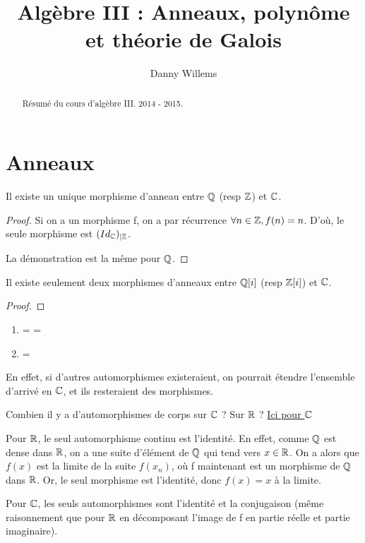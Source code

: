 \documentclass[a4paper, 12pt]{article}
\author{Danny Willems}
\title{Algèbre III : Anneaux, polynôme et théorie de Galois}
\begin{document}
\maketitle

\begin{abstract}
	Résumé du cours d'algèbre III. 2014 - 2015.
\end{abstract}

\section{Anneaux}

\begin{proposition}
	Il existe un unique morphisme d'anneau entre $\mathbb{Q}$ (resp $\mathbb{Z}$)
	et $\mathbb{C}$.
\end{proposition}

\begin{proof}
	Si on a un morphisme f, on a par récurrence $\forall n \in \mathbb{Z}, f(n) =
	n$. D'où, le seule morphisme est $({Id_{\mathbb{C}}})_{|\mathbb{Z}}$.

	La démonstration est la même pour $\mathbb{Q}$.
\end{proof}

\begin{proposition}
	Il existe seulement deux morphismes d'anneaux entre $\mathbb{Q}[i]$ (resp
	$\mathbb{Z}[i]$) et $\mathbb{C}$.
\end{proposition}

\begin{proof}
\end{proof}

\begin{corollary}
	\begin{enumerate}
		\item {} =
			 = 
		\item {} = 
	\end{enumerate}
	En effet, si d'autres automorphismes existeraient, on pourrait étendre
	l'ensemble d'arrivé en $\mathbb{C}$, et ils resteraient des morphismes.
\end{corollary}

\begin{question}
	Combien il y a d'automorphismes de corps sur $\mathbb{C}$ ? Sur $\mathbb{R}$ ?
	\href{http://www.math.uga.edu/~pete/Kestelman51.pdf}{Ici pour $\mathbb{C}$}

	Pour $\mathbb{R}$, le seul automorphisme continu est l'identité. En effet, comme
	$\mathbb{Q}$ est dense dans $\mathbb{R}$, on a une suite d'élément de $\mathbb{Q}$
	qui tend vers $x \in \mathbb{R}$. On a alors que $f(x)$ est la limite de la suite
	$f(x_{n})$, où f maintenant est un morphisme de $\mathbb{Q}$ dans $\mathbb{R}$.
	Or, le seul morphisme est l'identité, donc $f(x) = x$ à la limite.

	Pour $\mathbb{C}$, les seuls automorphismes sont l'identité et la conjugaison
	(même raisonnement que pour $\mathbb{R}$ en décomposant l'image de f en partie
	réelle et partie imaginaire).
\end{question}
\end{document}
